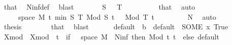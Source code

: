 \begin{isabellebody}
\ that{\isacharparenleft}{\kern0pt}{}{\isacharcomma}{\kern0pt}{}{\isacharcomma}{\kern0pt}{}{\isacharparenright}{\kern0pt}\ \isamarkupfalse%
\ N{\isacharunderscore}{\kern0pt}inf{\isacharunderscore}{\kern0pt}def\ \isamarkupfalse%
\ blast\isanewline
\ \ \ \ \isamarkupfalse%
\ \isamarkupfalse%
\ {\isachardoublequoteopen}S\ {\isachargreater}{\kern0pt}\ {}{\isachardoublequoteclose}\ {\isachardoublequoteopen}T\ {\isachargreater}{\kern0pt}\ {}{\isachardoublequoteclose}\isanewline
\ \ \ \ \ \ \isamarkupfalse%
\ that{\isacharparenleft}{\kern0pt}{}{\isacharcomma}{\kern0pt}{}{\isacharcomma}{\kern0pt}{}{\isacharparenright}{\kern0pt}\ \isamarkupfalse%
\ auto\isanewline
\ \ \ \ \isamarkupfalse%
\ \isamarkupfalse%
\ {\isachardoublequoteopen}{\isasymomega}\ {\isasymin}\ {\isacharbraceleft}{\kern0pt}{\isasymomega}\ {\isasymin}\ space\ {\isacharquery}{\kern0pt}M{\isachardot}{\kern0pt}\ {\isasymforall}t\ {\isasymin}{\isacharbraceleft}{\kern0pt}{}{\isachardot}{\kern0pt}{\isachardot}{\kern0pt}min\ S\ T{\isacharbraceright}{\kern0pt}{\isachardot}{\kern0pt}\ {\isacharparenleft}{\kern0pt}Mod\ S{\isacharparenright}{\kern0pt}\ t\ {\isasymomega}\ {\isacharequal}{\kern0pt}\ {\isacharparenleft}{\kern0pt}Mod\ T{\isacharparenright}{\kern0pt}\ t\ {\isasymomega}{\isacharbraceright}{\kern0pt}{\isachardoublequoteclose}\isanewline
\ \ \ \ \ \ \isamarkupfalse%
\ N{\isacharparenleft}{\kern0pt}{}{\isacharparenright}{\kern0pt}\ \isamarkupfalse%
\ auto\isanewline
\ \ \ \ \isamarkupfalse%
\ \isamarkupfalse%
\ {\isacharquery}{\kern0pt}thesis\isanewline
\ \ \ \ \ \ \isamarkupfalse%
\ that{\isacharparenleft}{\kern0pt}{}{\isacharparenright}{\kern0pt}\ \isamarkupfalse%
\ blast\isanewline
\ \ \isamarkupfalse%
\isanewline
\ \ \isamarkupfalse%
\ default\ {\isacharcolon}{\kern0pt}{\isacharcolon}{\kern0pt}\ {\isacharprime}{\kern0pt}b\ \ {\isachardoublequoteopen}default\ {\isacharequal}{\kern0pt}\ {\isacharparenleft}{\kern0pt}SOME\ x{\isachardot}{\kern0pt}\ True{\isacharparenright}{\kern0pt}{\isachardoublequoteclose}\isanewline
\ \ \isamarkupfalse%
\ X{\isacharunderscore}{\kern0pt}mod\ \ {\isachardoublequoteopen}X{\isacharunderscore}{\kern0pt}mod\ {\isasymequiv}\ {\isasymlambda}t\ {\isasymomega}{\isachardot}{\kern0pt}\ if\ {\isasymomega}\ {\isasymin}\ space\ {\isacharquery}{\kern0pt}M\ {\isacharminus}{\kern0pt}\ N{\isacharunderscore}{\kern0pt}inf\ then\ {\isacharparenleft}{\kern0pt}Mod\ {\isasymlfloor}t{\isacharplus}{\kern0pt}{}{\isasymrfloor}{\isacharparenright}{\kern0pt}\ t\ {\isasymomega}\ else\ default{\isachardoublequoteclose}\isanewline

\end{isabellebody}
